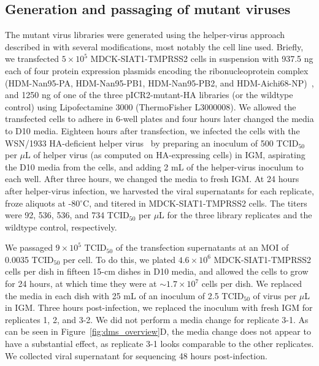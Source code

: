 \documentclass[9pt,twocolumn,twoside]{pnas-new}
\begin{document}
{\subsection*{Generation and passaging of mutant viruses}
The mutant virus libraries were generated using the helper-virus approach described in \cite{doud2016accurate} with several modifications, most notably the cell line used.
Briefly, we transfected $5 \times 10^5$ MDCK-SIAT1-TMPRSS2 cells in suspension with 937.5 ng each of four protein expression plasmids encoding the ribonucleoprotein complex (HDM-Nan95-PA, HDM-Nan95-PB1, HDM-Nan95-PB2, and HDM-Aichi68-NP)~\cite{gong2013stability}, and 1250 ng of one of the three pICR2-mutant-HA libraries (or the wildtype control) using Lipofectamine 3000 (ThermoFisher L3000008).
We allowed the transfected cells to adhere in 6-well plates and four hours later changed the media to D10 media.
Eighteen hours after transfection, we infected the cells with the WSN/1933 HA-deficient helper virus~\cite{doud2016accurate} by preparing an inoculum of 500 TCID$_{50}$ per $\mu$L of helper virus (as computed on HA-expressing cells) in IGM, aspirating the D10 media from the cells, and adding 2 mL of the helper-virus inoculum to each well.
After three hours, we changed the media to fresh IGM.
At 24 hours after helper-virus infection, we harvested the viral supernatants for each replicate, froze aliquots at -80$^{\circ}$C, and titered in MDCK-SIAT1-TMPRSS2 cells.
The titers were 92, 536, 536, and 734 TCID$_{50}$ per $\mu$L for the three library replicates and the wildtype control, respectively.

We passaged $9 \times 10^5$ TCID$_{50}$ of the transfection supernatants at an MOI of 0.0035 TCID$_{50}$ per cell.
To do this, we plated $4.6 \times 10^6$ MDCK-SIAT1-TMPRSS2 cells per dish in fifteen 15-cm dishes in D10 media, and allowed the cells to grow for 24 hours, at which time they were at $\sim 1.7 \times 10^7$ cells per dish.
We replaced the media in each dish with 25 mL of an inoculum of 2.5 TCID$_{50}$ of virus per $\mu$L in IGM.
Three hours post-infection, we replaced the inoculum with fresh IGM for replicates 1, 2, and 3-2.
We did not perform a media change for replicate 3-1.
As can be seen in Figure~\ref{fig:dms_overview}D, the media change does not appear to have a substantial effect, as replicate 3-1 looks comparable to the other replicates.
We collected viral supernatant for sequencing 48 hours post-infection.

}
\end{document}
